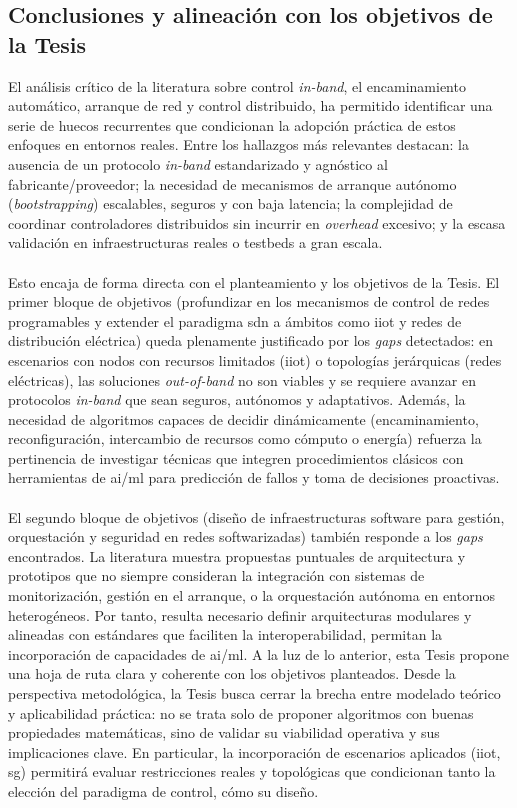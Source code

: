 \subsection{Conclusiones y alineación con los objetivos de la Tesis}
\label{subsec:conclu_inband}
El análisis crítico de la literatura sobre control \textit{in-band}, el encaminamiento automático, arranque de red y control distribuido, ha permitido identificar una serie de huecos recurrentes que condicionan la adopción práctica de estos enfoques en entornos reales. Entre los hallazgos más relevantes destacan: la ausencia de un protocolo \textit{in-band} estandarizado y agnóstico al fabricante/proveedor; la necesidad de mecanismos de arranque autónomo (\emph{bootstrapping}) escalables, seguros y con baja latencia; la complejidad de coordinar controladores distribuidos sin incurrir en \textit{overhead} excesivo; y la escasa validación en infraestructuras reales o testbeds a gran escala.\\
\\
Esto encaja de forma directa con el planteamiento y los objetivos de la Tesis. El primer bloque de objetivos (profundizar en los mecanismos de control de redes programables y extender el paradigma \gls{sdn} a ámbitos como \gls{iiot} y redes de distribución eléctrica) queda plenamente justificado por los \textit{gaps} detectados: en escenarios con nodos con recursos limitados (\gls{iiot}) o topologías jerárquicas (redes eléctricas), las soluciones \textit{out-of-band} no son viables y se requiere avanzar en protocolos \textit{in-band} que sean seguros, autónomos y adaptativos. Además, la necesidad de algoritmos capaces de decidir dinámicamente (encaminamiento, reconfiguración, intercambio de recursos como cómputo o energía) refuerza la pertinencia de investigar técnicas que integren procedimientos clásicos con herramientas de \gls{ai}/\gls{ml} para predicción de fallos y toma de decisiones proactivas.\\
\\
El segundo bloque de objetivos (diseño de infraestructuras software para gestión, orquestación y seguridad en redes softwarizadas) también responde a los \textit{gaps} encontrados. La literatura muestra propuestas puntuales de arquitectura y prototipos que no siempre consideran la integración con sistemas de monitorización, gestión en el arranque, o la orquestación autónoma en entornos heterogéneos. Por tanto, resulta necesario definir arquitecturas modulares y alineadas con estándares que faciliten la interoperabilidad, permitan la incorporación de capacidades de \gls{ai}/\gls{ml}. A la luz de lo anterior, esta Tesis propone una hoja de ruta clara y coherente con los objetivos planteados. Desde la perspectiva metodológica, la Tesis busca cerrar la brecha entre modelado teórico y aplicabilidad práctica: no se trata solo de proponer algoritmos con buenas propiedades matemáticas, sino de validar su viabilidad operativa y sus implicaciones clave. En particular, la incorporación de escenarios aplicados (\gls{iiot}, \gls{sg}) permitirá evaluar restricciones reales y topológicas que condicionan tanto la elección del paradigma de control, cómo su diseño.


